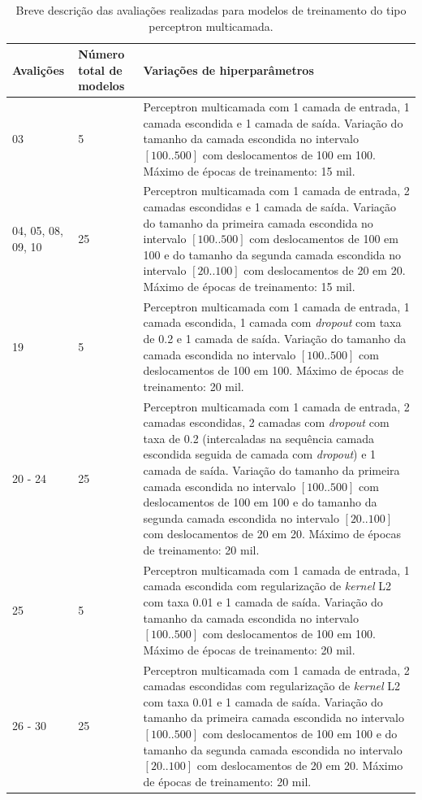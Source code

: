 \begin{table}[ht!]
  \begin{center}
  \setlength{\belowcaptionskip}{10pt}
  \footnotesize {
    \begin{tabular}{|p{1.5cm}|p{2cm}|p{12cm}|}
	  \hline
	  \textbf{Avalições} & \textbf{Número total de modelos} & \textbf{Variações de hiperparâmetros} \\
	  \hline
    03 & 5 & Perceptron multicamada com 1 camada de entrada, 1 camada escondida e 1 camada de saída. Variação do tamanho da camada escondida no intervalo $[100 .. 500]$ com deslocamentos de 100 em 100. Máximo de épocas de treinamento: 15 mil.\\
    \hline
    04, 05, 08, 09, 10 & 25 & Perceptron multicamada com 1 camada de entrada, 2 camadas escondidas e 1 camada de saída. Variação do tamanho da primeira camada escondida no intervalo $[100 .. 500]$ com deslocamentos de 100 em 100 e do tamanho da segunda camada escondida no intervalo $[20 .. 100]$ com deslocamentos de 20 em 20. Máximo de épocas de treinamento: 15 mil. \\
    \hline
    19 & 5 & Perceptron multicamada com 1 camada de entrada, 1 camada escondida, 1 camada com \textit{dropout} com taxa de 0.2 e 1 camada de saída. Variação do tamanho da camada escondida no intervalo $[100 .. 500]$ com deslocamentos de 100 em 100. Máximo de épocas de treinamento: 20 mil. \\
    \hline
    20 - 24 & 25 & Perceptron multicamada com 1 camada de entrada, 2 camadas escondidas, 2 camadas com \textit{dropout} com taxa de 0.2 (intercaladas na sequência camada escondida seguida de camada com \textit{dropout}) e 1 camada de saída. Variação do tamanho da primeira camada escondida no intervalo $[100 .. 500]$ com deslocamentos de 100 em 100 e do tamanho da segunda camada escondida no intervalo $[20 .. 100]$ com deslocamentos de 20 em 20. Máximo de épocas de treinamento: 20 mil. \\
    \hline
    25 & 5 & Perceptron multicamada com 1 camada de entrada, 1 camada escondida com regularização de \textit{kernel} L2 com taxa 0.01 e 1 camada de saída. Variação do tamanho da camada escondida no intervalo $[100 .. 500]$ com deslocamentos de 100 em 100. Máximo de épocas de treinamento: 20 mil. \\
    \hline
    26 - 30 & 25 & Perceptron multicamada com 1 camada de entrada, 2 camadas escondidas com regularização de \textit{kernel} L2 com taxa 0.01 e 1 camada de saída. Variação do tamanho da primeira camada escondida no intervalo $[100 .. 500]$ com deslocamentos de 100 em 100 e do tamanho da segunda camada escondida no intervalo $[20 .. 100]$ com deslocamentos de 20 em 20. Máximo de épocas de treinamento: 20 mil. \\
    \hline
    \end{tabular}
  }
  \caption{Breve descrição das avaliações realizadas para modelos de treinamento do tipo perceptron multicamada.}
  \label{table:descricao_avaliacoes_perceptron_multicamada}
  \end{center}
\end{table}


